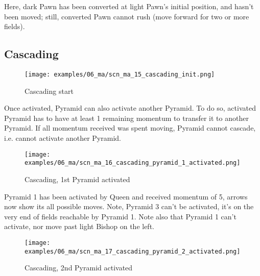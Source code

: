 Here, dark Pawn has been converted at light Pawn's initial position, and hasn't
been moved; still, converted Pawn cannot rush (move forward for two or more fields).

\clearpage %

\subsection*{Cascading}
\label{sec:Mayan Ascendancy/Pyramid/Cascading}

\noindent
\begin{figure}[!h]
\texttt{[image: examples/06\_ma/scn\_ma\_15\_cascading\_init.png]}
\caption{Cascading start}
\label{fig:scn_ma_15_cascading_init}
\end{figure}

Once activated, Pyramid can also activate another Pyramid. To do so, activated
Pyramid has to have at least 1 remaining momentum to transfer it to another
Pyramid. If all momentum received was spent moving, Pyramid cannot cascade, i.e.
cannot activate another Pyramid.

\clearpage %

\noindent
\begin{figure}[!h]
\texttt{[image: examples/06\_ma/scn\_ma\_16\_cascading\_pyramid\_1\_activated.png]}
\caption{Cascading, 1st Pyramid activated}
\label{fig:scn_ma_16_cascading_pyramid_1_activated}
\end{figure}

Pyramid 1 has been activated by Queen and received momentum of 5, arrows now show
its all possible moves. Note, Pyramid 3 can't be activated, it's on the very end
of fields reachable by Pyramid 1. Note also that Pyramid 1 can't activate, nor move
past light Bishop on the left.

\clearpage %

\noindent
\begin{figure}[!h]
\texttt{[image: examples/06\_ma/scn\_ma\_17\_cascading\_pyramid\_2\_activated.png]}
\caption{Cascading, 2nd Pyramid activated}
\label{fig:scn_ma_17_cascading_pyramid_2_activated}
\end{figure}

